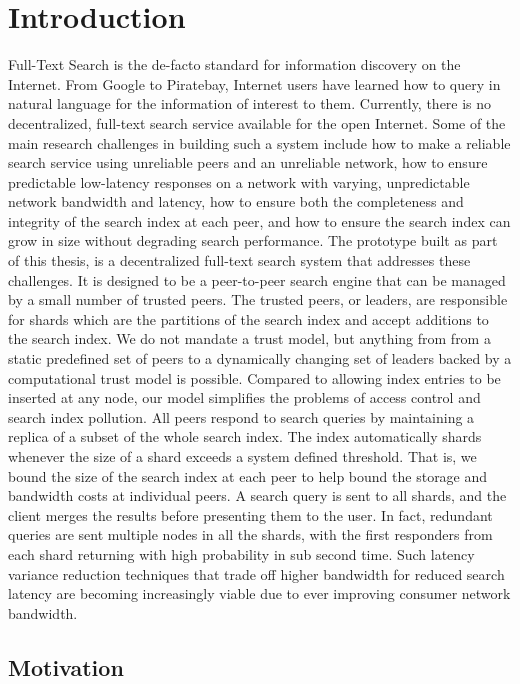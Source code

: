 \documentclass[a4paper,11pt]{kth-mag}
\begin{document}
\chapter{Introduction}
\label{chap:introduction}
Full-Text Search is the de-facto standard for information discovery on the Internet. From Google to Piratebay, Internet users have learned how to query in natural language for the information of interest to them. Currently, there is no decentralized, full-text search service available for the open Internet. Some of the main research challenges in building such a system include how to make a reliable search service using unreliable peers and an unreliable network, how to ensure predictable low-latency responses on a network with varying, unpredictable network bandwidth and latency, how to ensure both the completeness and integrity of the search index at each peer, and how to ensure the search index can grow in size without degrading search performance. The prototype built as part of this thesis, is a decentralized full-text search system that addresses these challenges. It is designed to be a peer-to-peer search engine that can be managed by a small number of trusted peers. The trusted peers, or leaders, are responsible for shards which are the partitions of the search index and accept additions to the search index. We do not mandate a trust model, but anything from from a static predefined set of peers to a dynamically changing set of leaders backed by a computational trust model is possible. Compared to allowing index entries to be inserted at any node, our model simplifies the problems of access control and search index pollution. All peers respond to search queries by maintaining a replica of a subset of the whole search index. The index automatically shards whenever the size of a shard exceeds a system defined threshold. That is, we bound the size of the search index at each peer to help bound the storage and bandwidth costs at individual peers. A search query is sent to all shards, and the client merges the results before presenting them to the user. In fact, redundant queries are sent multiple nodes in all the shards, with the first responders from each shard returning with high probability in sub second time. Such latency variance reduction techniques that trade off higher bandwidth for reduced search latency are becoming increasingly viable due to ever improving consumer network bandwidth.


\section{Motivation}
\label{sec:motivation}
\end{document}
